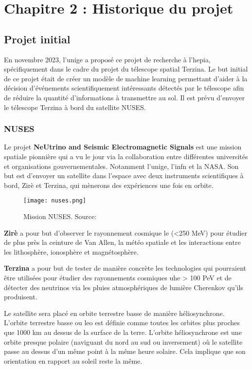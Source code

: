 \chapter{Chapitre 2 : Historique du projet}

\section{Projet initial}

En novembre 2023, l'\gls{unige} a proposé ce projet de recherche à l'\gls{hepia}, spécifiquement dans le cadre du projet du télescope spatial Terzina. 
Le but initial de ce projet était de créer un modèle de machine learning permettant d'aider à la décision d'événements scientifiquement intéressants 
détectés par le télescope afin de réduire la quantité d'informations à transmettre au sol. 
Il est prévu d'envoyer le télescope Terzina à bord du satellite NUSES.

\subsection{NUSES}
Le projet \textbf{NeUtrino and Seismic Electromagnetic Signals} est une mission spatiale pionnière qui 
a vu le jour via la collaboration entre différentes universités et organisations gouvernementales. \cite{Nuses}
Notamment l'\gls{unige}, l'\gls{infn} et la NASA.
Son but est d'envoyer un satellite dans l'espace avec deux instruments scientifiques à bord, Zirè et Terzina, qui mènerons 
des expériences une fois en orbite.

\begin{figure}[tbph!]
	\centering
	\texttt{[image: nuses.png]}
	\caption[Mission NUSES]{Mission NUSES. Source: \cite{Nuses}}
\end{figure}

\textbf{Zirè} a pour but d'observer le rayonnement cosmique \gls{le} (<250 MeV) pour étudier de plus près la ceinture de Van Allen,
la météo spatiale et les interactions entre les lithosphère, ionosphère et magnétosphère.

\textbf{Terzina} a pour but de tester de manière concrète les technologies qui pourraient être utilisées pour étudier des rayonnements cosmiques
\gls{uhe} > 100 PeV et de détecter des neutrinos via les pluies atmosphériques de lumière Cherenkov qu'ils produisent.


Le satellite sera placé en orbite terrestre basse de manière héliosynchrone.
L'orbite terrestre basse ou \gls{leo} est définie comme toutes les orbites plus proches que 1000 km au dessus de la surface de la terre.\cite{LowEarthOrbit}
L'orbite héliosynchrone est une orbite presque polaire (naviguant du nord au sud ou inversement) où le satellite 
passe au dessus d'un même point à la même heure solaire. Cela implique que son orientation en rapport au soleil reste la même.

